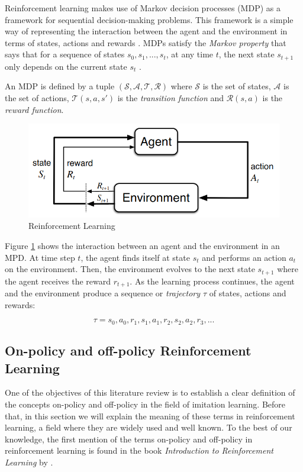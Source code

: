 Reinforcement learning makes use of Markov decision processes (MDP) as a framework for sequential decision-making problems. This framework is a simple way of representing the interaction between the agent and the environment in terms of states, actions and rewards \cite{Sutton:1998}. MDPs satisfy the \textit{Markov property} that says that for a sequence of states $s_0, s_1, ..., s_t$, at any time $t$, the next state $s_{t+1}$ only depends on the current state $s_t$ \cite{Osa:2018}.

An MDP is defined by a tuple $(\mathcal{S}, \mathcal{A}, \mathcal{T}, \mathcal{R})$ where $\mathcal{S}$ is the set of states, $\mathcal{A}$ is the set of actions, $\mathcal{T}(s, a, s')$ is the \textit{transition function} and $\mathcal{R}(s, a)$ is the \textit{reward function}.

\begin{figure}[H]
    \centering
    \includegraphics[width=.7\textwidth]{Figures/reinforcement_learning.png}
    \caption{Reinforcement Learning}
    \label{fig:reinforcement_learning}
\end{figure}

Figure \ref{fig:reinforcement_learning} shows the interaction between an agent and the environment in an MPD. At time step $t$, the agent finds itself at state $s_t$ and performs an action $a_t$ on the environment. Then, the environment evolves to the next state $s_{t+1}$ where the agent receives the reward $r_{t+1}$. As the learning process continues, the agent and the environment produce a sequence or \textit{trajectory $\tau$} of states, actions and rewards:


\begin{equation}
\tau = s_0, a_0, r_1,s_1, a_1, r_2,s_2, a_2, r_3, ...
\label{eq:value-function}
\end{equation}

\subsection{On-policy and off-policy Reinforcement Learning}
\label{section:on and off-policy Reinforcement Learning}
One of the objectives of this literature review is to establish a clear definition of the concepts on-policy and off-policy in the field of imitation learning. Before that, in this section we will explain the meaning of these terms in reinforcement learning, a field where they are widely used and well known. To the best of our knowledge, the first mention of the terms on-policy and off-policy in reinforcement learning is found in the book \textit{Introduction to Reinforcement Learning} by \cite{Sutton:1998}.

